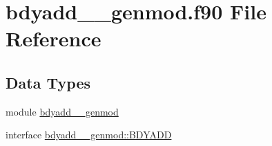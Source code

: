 \hypertarget{bdyadd____genmod_8f90}{\section{bdyadd\+\_\+\+\_\+genmod.\+f90 File Reference}
\label{bdyadd____genmod_8f90}
}
\subsection*{Data Types}
\begin{DoxyCompactItemize}
\item 
module \hyperlink{classbdyadd____genmod}{bdyadd\+\_\+\+\_\+genmod}
\item 
interface \hyperlink{interfacebdyadd____genmod_1_1BDYADD}{bdyadd\+\_\+\+\_\+genmod\+::\+B\+D\+Y\+A\+D\+D}
\end{DoxyCompactItemize}
